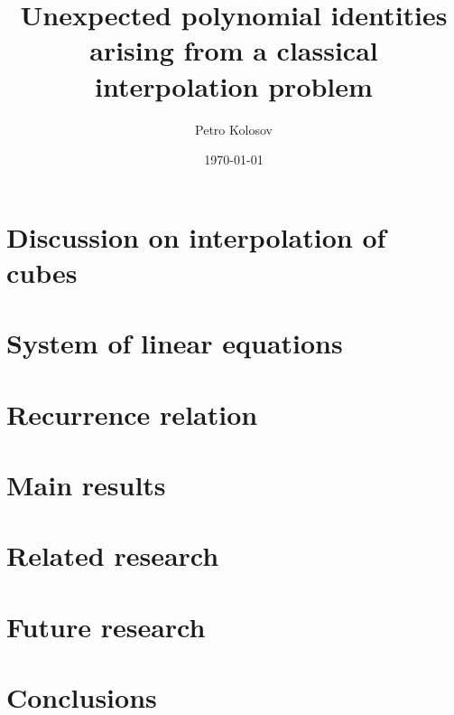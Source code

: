 \documentclass[12pt,letterpaper,oneside,reqno]{amsart}
\title[Unexpected polynomial identities arising from a class. interpolation problem]
{Unexpected polynomial identities arising from a classical interpolation problem}
\author[Petro Kolosov]{Petro Kolosov}
\date{\today}
\begin{document}
    \maketitle

    \begin{abstract}
        
    \end{abstract}

    \tableofcontents


    \section{Discussion on interpolation of cubes}
    \label{sec:the-problem-of-interpolation-of-cubes}
    


    \section{System of linear equations}
    \label{sec:system-of-linear-equations-approach}
    


    \section{Recurrence relation}
    \label{sec:recurrence-relation-approach}
    


    \section{Main results}
    \label{sec:main-results}
    


    \section{Related research}\label{sec:related-research}
    


    \section{Future research}\label{sec:future-research}
    


    \section{Conclusions}\label{sec:conclusions}
    
\end{document}
